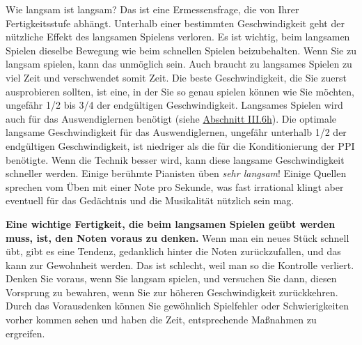 Wie langsam ist langsam?
Das ist eine Ermessensfrage, die von Ihrer Fertigkeitsstufe abhängt.
Unterhalb einer bestimmten Geschwindigkeit geht der nützliche Effekt des langsamen Spielens verloren.
Es ist wichtig, beim langsamen Spielen dieselbe Bewegung wie beim schnellen Spielen beizubehalten.
Wenn Sie zu langsam spielen, kann das unmöglich sein.
Auch braucht zu langsames Spielen zu viel Zeit und verschwendet somit Zeit.
Die beste Geschwindigkeit, die Sie zuerst ausprobieren sollten, ist eine, in der Sie so genau spielen können wie Sie möchten, ungefähr 1/2 bis 3/4 der endgültigen Geschwindigkeit.
Langsames Spielen wird auch für das Auswendiglernen benötigt (siehe \hyperlink{c1iii6h}{Abschnitt III.6h}).
Die optimale langsame Geschwindigkeit für das Auswendiglernen, ungefähr unterhalb 1/2 der endgültigen Geschwindigkeit, ist niedriger als die für die Konditionierung der PPI benötigte.
Wenn die Technik besser wird, kann diese langsame Geschwindigkeit schneller werden.
Einige berühmte Pianisten üben \textit{sehr langsam}!
Einige Quellen sprechen vom Üben mit einer Note pro Sekunde, was fast irrational klingt aber eventuell für das Gedächtnis und die Musikalität nützlich sein mag.

\textbf{Eine wichtige Fertigkeit, die beim langsamen Spielen geübt werden muss, ist, den Noten voraus zu denken.}
Wenn man ein neues Stück schnell übt, gibt es eine Tendenz, gedanklich hinter die Noten zurückzufallen, und das kann zur Gewohnheit werden.
Das ist schlecht, weil man so die Kontrolle verliert.
Denken Sie voraus, wenn Sie langsam spielen, und versuchen Sie dann, diesen Vorsprung zu bewahren, wenn Sie zur höheren Geschwindigkeit zurückkehren.
Durch das Vorausdenken können Sie gewöhnlich Spielfehler oder Schwierigkeiten vorher kommen sehen und haben die Zeit, entsprechende Maßnahmen zu ergreifen.



